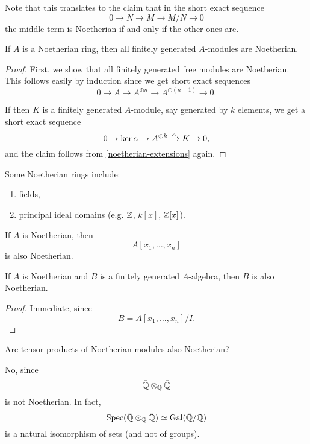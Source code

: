 Note that this translates to the claim that in the short exact sequence
\[ 0 \to N \to M \to M/{N} \to 0\]
the middle term is Noetherian if and only if the other ones are.

\begin{corollary}
  If $A$ is a Noetherian ring, then all finitely generated $A$-modules are Noetherian.
\end{corollary}
\begin{proof}
  First, we show that all finitely generated free modules are Noetherian. This follows easily by induction since we get short exact sequences
  \[ 0 \to A \to A^{\oplus n} \to A^{\oplus (n-1)} \to 0.\]

  If then $K$ is a finitely generated $A$-module, say generated by $k$ elements, we get a short exact sequence
  \[ 0 \to \ker{\alpha} \to A^{\oplus k} \xrightarrow{\alpha} K \to 0,\]
  and the claim follows from \cref{noetherian-extensions} again.
\end{proof}


\begin{example}
  Some Noetherian rings include:
  \begin{enumerate}
  \item fields,
  \item principal ideal domains (e.g. $\mathbb Z$, $k[x]$, $\mathbb Z[x]$).
  \end{enumerate}
\end{example}


\begin{theorem}
  If $A$ is Noetherian, then
  \[ A[x_1, \dotsc, x_n]\]
  is also Noetherian.
\end{theorem}

\begin{corollary}
  If $A$ is Noetherian and $B$ is a finitely generated $A$-algebra, then $B$ is also Noetherian.
\end{corollary}
\begin{proof}
  Immediate, since
  \[ B = A[x_1, \dotsc, x_n]/{I}.\]
\end{proof}

\begin{question}
  Are tensor products of Noetherian modules also Noetherian?
\end{question}
\begin{answer}
  No, since
  \[ \bar {\mathbb Q} \otimes_{\mathbb Q} \bar {\mathbb Q}\]
  is not Noetherian.
  In fact,
  \[ \text{Spec}(\bar {\mathbb Q} \otimes_{\mathbb Q} \bar {\mathbb Q} ) \simeq \text{Gal}(\bar{\mathbb Q}/{\mathbb Q}) \]
  is a natural isomorphism of sets (and not of groups).
\end{answer}

